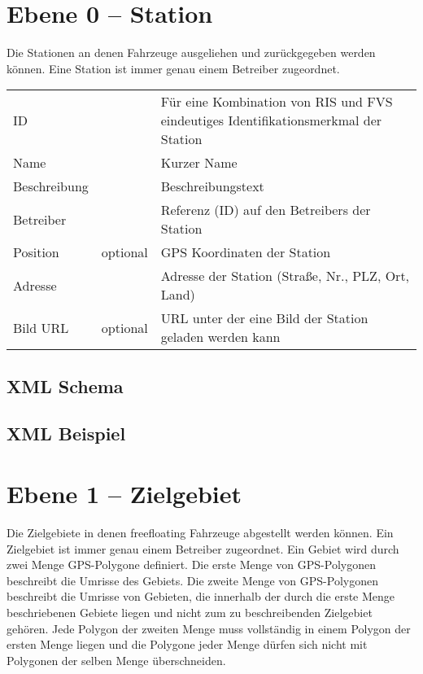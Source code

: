 \section{Ebene 0 -- Station}
Die Stationen an denen Fahrzeuge ausgeliehen und zurückgegeben werden können. Eine Station ist immer genau einem Betreiber zugeordnet.

\begin{flushleft}
\begin{tabularx}{\linewidth}{l>{\raggedright\arraybackslash}l>{\raggedright\arraybackslash}X} 
\toprule
ID & & Für eine Kombination von RIS und FVS eindeutiges Identifikationsmerkmal der Station \\
Name & & Kurzer Name \\
Beschreibung & & Beschreibungstext \\
Betreiber & & Referenz (ID) auf den Betreibers der Station \\
Position & optional & GPS Koordinaten der Station \\
Adresse & & Adresse der Station (Straße, Nr., PLZ, Ort, Land) \\
Bild URL & optional & URL unter der eine Bild der Station geladen werden kann \\
\bottomrule
\end{tabularx}
\end{flushleft}

\subsection{XML Schema}


\subsection{XML Beispiel}

\section{Ebene 1 -- Zielgebiet}
Die Zielgebiete in denen freefloating Fahrzeuge abgestellt werden können. Ein Zielgebiet ist immer genau einem Betreiber zugeordnet. Ein Gebiet wird durch zwei Menge GPS-Polygone definiert. Die erste Menge von GPS-Polygonen beschreibt die Umrisse des Gebiets. Die zweite Menge von GPS-Polygonen beschreibt die Umrisse von Gebieten, die innerhalb der durch die erste Menge beschriebenen Gebiete liegen und nicht zum zu beschreibenden Zielgebiet gehören. Jede Polygon der zweiten Menge muss vollständig in einem Polygon der ersten Menge liegen und die Polygone jeder Menge dürfen sich nicht mit Polygonen der selben Menge überschneiden.

